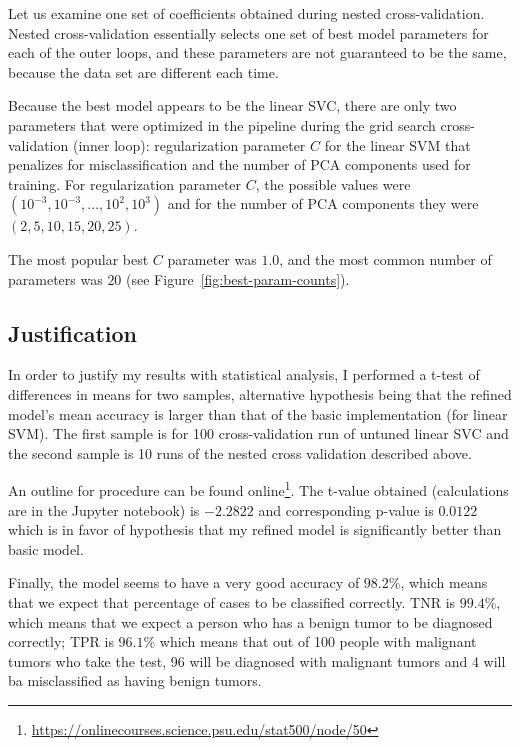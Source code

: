 \documentclass[10pt, a4paper]{article}
\begin{document}


Let us examine one set of coefficients obtained during nested cross-validation. Nested cross-validation essentially selects one set of best model parameters for each of the outer loops, and these parameters are not guaranteed to be the same, because the data set are different each time.

Because the best model appears to be the linear SVC, there are only two parameters that were optimized in the pipeline during the grid search cross-validation (inner loop): regularization parameter $C$ for the linear SVM that penalizes for misclassification and the number of PCA components used for training. For regularization parameter $C$, the possible values were $(10^{-3}, 10^{-3}, \dots, 10^{2}, 10^{3})$ and for the number of PCA components they were $(2, 5, 10, 15, 20, 25)$.

The most popular best $C$ parameter was $1.0$, and the most common number of parameters was $20$ (see Figure~\ref{fig:best-param-counts}).

\subsection{Justification}

In order to justify my results with statistical analysis, I performed a t-test of differences in means for two samples, alternative hypothesis being that the refined model's mean accuracy is larger than that of the basic implementation (for linear SVM). The first sample is for 100 cross-validation run of untuned linear SVC and the second sample is 10 runs of the nested cross validation described above.

An outline for procedure can be found online\footnote{\scriptsize \url{https://onlinecourses.science.psu.edu/stat500/node/50}}. The t-value obtained (calculations are in the Jupyter notebook) is $-2.2822$ and corresponding p-value is $0.0122$ which is in favor of hypothesis that my refined model is significantly better than basic model.

Finally, the model seems to have a very good accuracy of $98.2\%$, which means that we expect that percentage of cases to be classified correctly. TNR is $99.4\%$, which means that we expect a person who has a benign tumor to be diagnosed correctly; TPR is $96.1\%$ which means that out of 100 people with malignant tumors who take the test, 96 will be diagnosed with malignant tumors and 4 will ba misclassified as having benign tumors.
\end{document}
